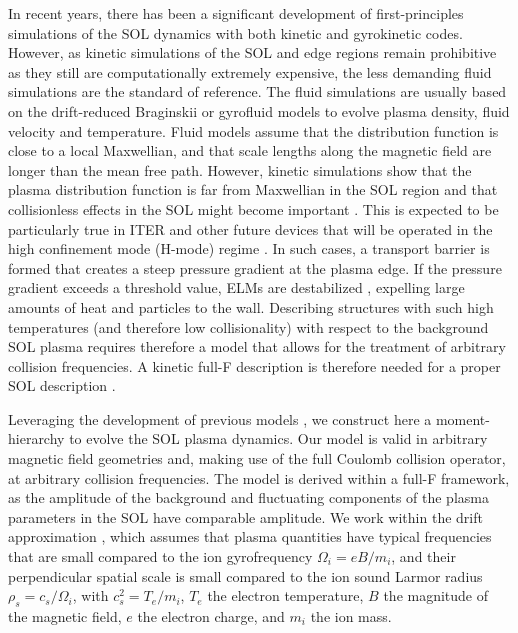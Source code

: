 {In recent years, there has been a significant development of first-principles simulations of the SOL dynamics} with both kinetic \citep{Tskhakaya2012} and gyrokinetic \citep{Xu2007, Shi2015, Chang2017,Shi2017} codes.
%
However, as kinetic simulations {of the SOL and edge regions} remain prohibitive as they still are computationally extremely expensive, the less demanding fluid simulations are the standard of reference.
%
The fluid simulations are usually based on the drift-reduced Braginskii \citep{Braginskii1965,Zeiler1997} or gyrofluid \citep{Ribeiro2008a,Held2016} models to evolve plasma density, fluid velocity and temperature. Fluid models assume that the distribution function is close to a local Maxwellian, and that scale lengths along the magnetic field are longer than the mean free path.
%
However, kinetic simulations show that the plasma distribution function is far from Maxwellian in the SOL region \citep{Tskhakaya2008,Lonnroth2006,Battaglia2014} and that collisionless effects in the SOL might become important \citep{Batishchev1997}.
%
This is expected to be particularly true in ITER and other future devices that will be operated in the high confinement mode (H-mode) regime \citep{Martin2008}.
%
In such cases, a transport barrier is formed that creates a steep pressure gradient at the plasma edge.
%
If the pressure gradient exceeds a threshold value, ELMs are destabilized \citep{Leonard2014}, expelling large amounts of heat and particles to the wall.
%
Describing structures with such high temperatures (and therefore low collisionality) with respect to the background SOL plasma requires therefore a model that allows for the treatment of arbitrary collision frequencies.
%
A kinetic full-F description is therefore needed for a proper SOL description \citep{Hazeltine1998}.

Leveraging the development of previous models {\citep{Hammett1993,Dorland1993,Beer1996,Sugama2001,Ji2010,Zocco2011,Schekochihin2016,Hatch2016,Parker2016,Hirvijoki2016,Mandell2018}}, we construct here a moment-hierarchy to evolve the SOL plasma dynamics.
%
Our model is valid in arbitrary magnetic field geometries and, making use of the full Coulomb collision operator, at arbitrary collision frequencies.
%
The model is derived within a full-F framework, as the amplitude of the background and fluctuating components of the plasma parameters in the SOL have comparable amplitude. We work within the drift approximation \citep{Hinton1976, Cary2009}, which assumes that plasma quantities have typical frequencies that are small compared to the ion gyrofrequency $\Omega_i=e B /m_i$, and their perpendicular spatial scale is small compared to the ion sound Larmor radius $\rho_s=c_s/\Omega_i$, with $c_s^2 = T_e/m_i$, $T_e$ the electron temperature, $B$ the magnitude of the magnetic field, $e$ the electron charge, and $m_i$ the ion mass.

